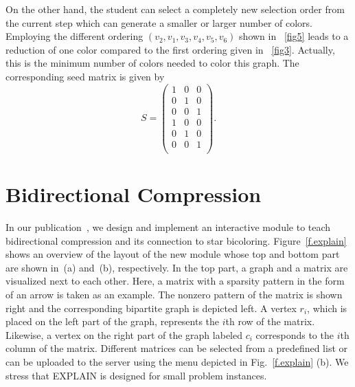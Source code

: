 \documentclass[12pt, oneside]{book}
\begin{document}
On the other hand, the student can select a completely new selection order from the current step which can generate a smaller or larger number of colors. Employing the different ordering $(v_2,v_1,v_3,v_4,v_5,v_6)$ shown in \figurename~\ref{fig5} leads to a reduction of one color compared to the first ordering given in \figurename~\ref{fig3}. Actually, this is the minimum number of colors needed to color this graph. The corresponding seed matrix is given by
$$
S =
 \begin{pmatrix}
 1 & 0 & 0 \\
 0 & 1 & 0 \\
 0 & 0 & 1 \\
 1 & 0 & 0 \\
 0 & 1 & 0 \\
 0 & 0 & 1 \\
 \end{pmatrix}.
$$

\section{Bidirectional Compression}
\label{s.bidirectional}
In our publication~\cite{2014:09}, we design and implement an interactive module to
teach bidirectional compression and its connection to star bicoloring.
Figure~\ref{f.explain} shows an overview of the layout of the new module whose top and
bottom part are shown in~(a) and~(b), respectively. In the top part, a graph and a matrix
are visualized next to each other. Here, a matrix with a sparsity pattern in the form of
an arrow is taken as an example. The nonzero pattern of the matrix is shown right and the
corresponding bipartite graph is depicted left. A vertex $r_i$, which is placed on the
left part of the graph, represents the $i$th row of the matrix. Likewise, a vertex on the
right part of the graph labeled $c_i$ corresponds to the $i$th column of the matrix.
Different matrices can be selected from a predefined list or can be uploaded to the
server using the menu depicted in Fig.~\ref{f.explain} (b). We stress that EXPLAIN is
designed for small problem instances.
\end{document}
